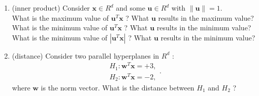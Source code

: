 \documentclass[12pt]{article}
\theoremstyle{definition}
\begin{document}
\begin{enumerate}
\begin{enumerate}
     \end{enumerate}
    \item (inner product)
    Consider  $\mathbf{x} \in R^{d}$  and some  $\mathbf{u} \in R^{d}$  with  $\|\mathbf{u}\|=1 .$\\
    What is the maximum value of  $\mathbf{u}^{T} \mathbf{x}$  ? What  $\mathbf{u}$  results in the maximum value?\\
    What is the minimum value of  $\mathbf{u}^{T} \mathbf{x}$  ? What  $\mathbf{u}$  results in the minimum value?\\
    What is the minimum value of  $\left|\mathbf{u}^{T} \mathbf{x}\right|$ ? What  $\mathbf{u}$  results in the minimum value?
    \item (distance)
    Consider two parallel hyperplanes in  $R^{d}$  :
    \[
    \begin{array}{l}
       H_{1}: \mathbf{w}^{T} \mathbf{x}=+3, \\
       H_{2}: \mathbf{w}^{T} \mathbf{x}=-2,
    \end{array}
    .\] 
    where  $\mathbf{w}$  is the norm vector. What is the distance between  $H_{1}$  and  $H_{2}$  ?
\end{enumerate}
\end{document}
